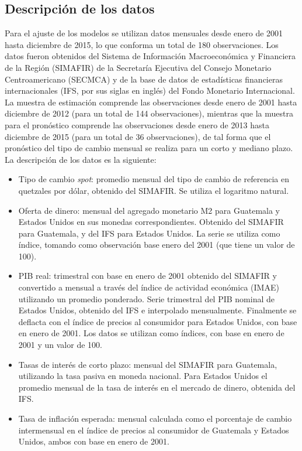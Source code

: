 \subsection{Descripción de los datos}
\label{subsec:descdatos}
Para el ajuste de los modelos se utilizan datos mensuales desde enero de 2001 hasta diciembre de 2015, lo que conforma un total de 180 observaciones. Los datos fueron obtenidos del Sistema de Información Macroeconómica y Financiera de la Región (SIMAFIR) de la Secretaría Ejecutiva del Consejo Monetario Centroamericano (SECMCA) y de la base de datos de estadísticas financieras internacionales (IFS, por sus siglas en inglés) del Fondo Monetario Internacional.\\

La muestra de estimación comprende las observaciones desde enero de 2001 hasta diciembre de 2012 (para un total de 144 observaciones), mientras que la muestra para el pronóstico comprende las observaciones desde enero de 2013 hasta diciembre de 2015 (para un total de 36 observaciones), de tal forma que el pronóstico del tipo de cambio mensual se realiza para un corto y mediano plazo.\\

La descripción de los datos es la siguiente:

\begin{itemize}
	\item Tipo de cambio \textit{spot}: promedio mensual del tipo de cambio de referencia en quetzales por dólar, obtenido del SIMAFIR. Se utiliza el logaritmo natural.
	
	\item Oferta de dinero: mensual del agregado monetario M2 para Guatemala y Estados Unidos en sus monedas correspondientes. Obtenido del SIMAFIR para Guatemala, y del IFS para Estados Unidos. La serie se utiliza como índice, tomando como observación base enero del 2001 (que tiene un valor de 100).
	
	\item PIB real: trimestral con base en enero de 2001 obtenido del SIMAFIR y convertido a mensual a través del índice de actividad económica (IMAE) utilizando un promedio ponderado. Serie trimestral del PIB nominal de Estados Unidos, obtenido del IFS e interpolado mensualmente. Finalmente se deflacta con el índice de precios al consumidor para Estados Unidos, con base en enero de 2001. Los datos se utilizan como índices, con base en enero de 2001 y un valor de 100.
	
	\item Tasas de interés de corto plazo: mensual del SIMAFIR para Guatemala, utilizando la tasa pasiva en moneda nacional. Para Estados Unidos el promedio mensual de la tasa de interés en el mercado de dinero, obtenida del IFS.
	
	\item Tasa de inflación esperada: mensual calculada como el porcentaje de cambio intermensual en el índice de precios al consumidor de Guatemala y Estados Unidos, ambos con base en enero de 2001.
	
\end{itemize}


